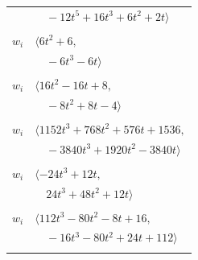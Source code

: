 \documentclass[11pt]{article}
\begin{document}
\begin{longtable}{@{}ll@{}}
 & $\quad -12t^{5}+16t^{3}+6t^{2}+2t\rangle$\\
\addlinespace[2pt]
\multicolumn{2}{@{}p{0.97\textwidth}@{}}{$i=16$, $D_i=1$, $\rho_{ij}$: $0{:}3, \allowbreak 13{:}1, \allowbreak 18{:}3, \allowbreak 19{:}3, \allowbreak 27{:}1$}\\
$w_i$ & $\langle 6t^{2}+6,$\\
 & $\quad -6t^{3}-6t\rangle$\\
\addlinespace[2pt]
\multicolumn{2}{@{}p{0.97\textwidth}@{}}{$i=17$, $D_i=2$, $e_i=0$, $\rho_{ij}$: $4{:}2, \allowbreak 11{:}1, \allowbreak 14{:}2, \allowbreak 33{:}1, \allowbreak 34{:}2, \allowbreak 41{:}3$}\\
$w_i$ & $\langle 16t^{2}-16t+8,$\\
 & $\quad -8t^{2}+8t-4\rangle$\\
\addlinespace[2pt]
\multicolumn{2}{@{}p{0.97\textwidth}@{}}{$i=18$, $D_i=8$, $e_i=3$, $\rho_{ij}$: $5{:}3, \allowbreak 10{:}2, \allowbreak 13{:}3, \allowbreak 16{:}1, \allowbreak 23{:}1, \allowbreak 28{:}3, \allowbreak 32{:}3, \allowbreak 34{:}2, \allowbreak 36{:}2, \allowbreak 39{:}2, \allowbreak 41{:}3$}\\
$w_i$ & $\langle 1152t^{3}+768t^{2}+576t+1536,$\\
 & $\quad -3840t^{3}+1920t^{2}-3840t\rangle$\\
\addlinespace[2pt]
\multicolumn{2}{@{}p{0.97\textwidth}@{}}{$i=19$, $D_i=2$, $e_i=0$, $\rho_{ij}$: $13{:}3, \allowbreak 16{:}1, \allowbreak 23{:}3, \allowbreak 29{:}2, \allowbreak 30{:}1, \allowbreak 34{:}1, \allowbreak 40{:}2, \allowbreak 41{:}2$}\\
$w_i$ & $\langle -24t^{3}+12t,$\\
 & $\quad 24t^{3}+48t^{2}+12t\rangle$\\
\addlinespace[2pt]
\multicolumn{2}{@{}p{0.97\textwidth}@{}}{$i=20$, $D_i=2$, $e_i=0$, $\rho_{ij}$: $7{:}1, \allowbreak 11{:}2, \allowbreak 14{:}2, \allowbreak 15{:}2, \allowbreak 22{:}1, \allowbreak 23{:}3, \allowbreak 25{:}1, \allowbreak 28{:}2, \allowbreak 29{:}2, \allowbreak 30{:}2, \allowbreak 34{:}1, \allowbreak 39{:}3, \allowbreak 40{:}1$}\\
$w_i$ & $\langle 112t^{3}-80t^{2}-8t+16,$\\
 & $\quad -16t^{3}-80t^{2}+24t+112\rangle$\\
\addlinespace[2pt]
\multicolumn{2}{@{}p{0.97\textwidth}@{}}{$i=21$, $D_i=4$, $e_i=1$, $\rho_{ij}$: $4{:}3, \allowbreak 6{:}1, \allowbreak 12{:}2, \allowbreak 14{:}3, \allowbreak 15{:}1, \allowbreak 25{:}3, \allowbreak 29{:}2, \allowbreak 30{:}3, \allowbreak 34{:}3, \allowbreak 37{:}2$}\\

\end{longtable}
\end{document}
